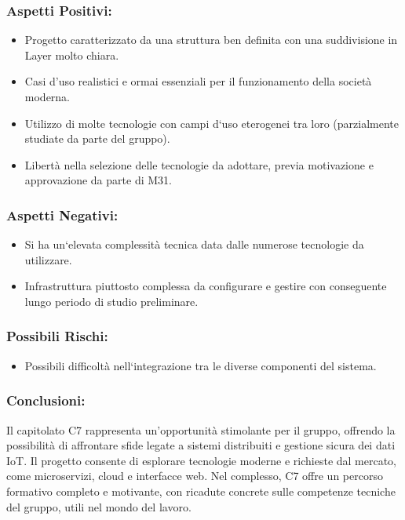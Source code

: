 \documentclass[a4paper,12pt]{article}
\begin{document}
\subsubsection*{Aspetti Positivi:}
\begin{itemize}
    \item Progetto caratterizzato da una struttura ben definita con una suddivisione in
          Layer molto chiara.
    \item Casi d'uso realistici e ormai essenziali per il funzionamento della società
          moderna.
    \item Utilizzo di molte tecnologie con campi d`uso eterogenei tra loro (parzialmente
          studiate da parte del gruppo).
    \item Libertà nella selezione delle tecnologie da adottare, previa motivazione e
          approvazione da parte di M31.
\end{itemize}

\subsubsection*{Aspetti Negativi:}
\begin{itemize}
    \item Si ha un`elevata complessità tecnica data dalle numerose tecnologie da
          utilizzare.
    \item Infrastruttura piuttosto complessa da configurare e gestire con conseguente
          lungo periodo di studio preliminare.
\end{itemize}

\subsubsection*{Possibili Rischi:}
\begin{itemize}
    \item Possibili difficoltà nell`integrazione tra le diverse componenti del sistema.
\end{itemize}

\subsubsection*{Conclusioni:}
Il capitolato C7 rappresenta un'opportunità stimolante per il gruppo, offrendo la possibilità di affrontare sfide legate a sistemi distribuiti e gestione sicura dei dati IoT.
Il progetto consente di esplorare tecnologie moderne e richieste dal mercato, come microservizi, cloud e interfacce web. Nel complesso, C7 offre un percorso formativo completo e motivante, con ricadute concrete sulle competenze tecniche del gruppo, utili nel mondo del lavoro.
\vspace{2.0cm}
\end{document}
